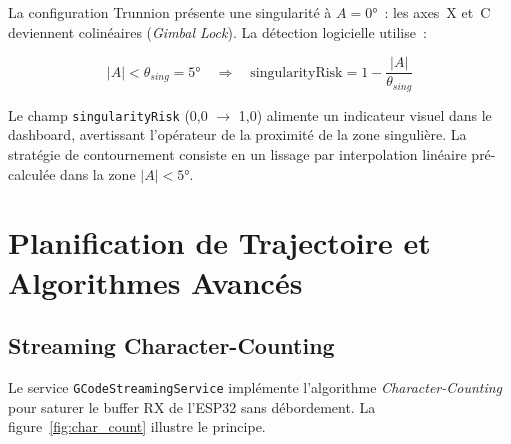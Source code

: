 \documentclass[12pt,a4paper]{report}
\newcommand{\code}[1]{\texttt{\small #1}}
\begin{document}
La configuration Trunnion présente une singularité à $A = 0°$~: les axes~X et~C deviennent colinéaires (\textit{Gimbal Lock}). La détection logicielle utilise~:

\begin{equation}
|A| < \theta_{sing} = 5° \quad \Rightarrow \quad \text{singularityRisk} = 1 - \frac{|A|}{\theta_{sing}}
\label{eq:singularity}
\end{equation}

Le champ \code{singularityRisk} (0{,}0 $\rightarrow$ 1{,}0) alimente un indicateur visuel dans le dashboard, avertissant l'opérateur de la proximité de la zone singulière. La stratégie de contournement consiste en un lissage par interpolation linéaire pré-calculée dans la zone $|A| < 5°$.

\section{Planification de Trajectoire et Algorithmes Avancés}

\subsection{Streaming Character-Counting}

Le service \code{GCodeStreamingService} implémente l'algorithme \textit{Character-Counting} pour saturer le buffer RX de l'ESP32 sans débordement. La figure~\ref{fig:char_count} illustre le principe.
\end{document}
